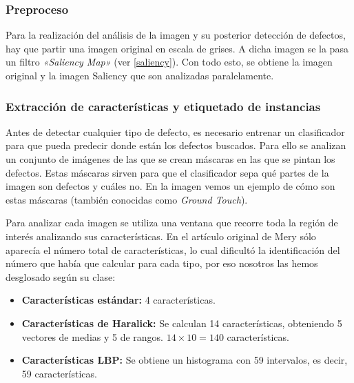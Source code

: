 \subsubsection{Preproceso}
Para la realización del análisis de la imagen y su posterior detección de defectos, hay que partir una imagen original en escala de grises. A dicha imagen se la pasa un filtro \textit{«Saliency Map»} (ver \ref{saliency}). Con todo esto, se obtiene la imagen original y la imagen Saliency que son analizadas paralelamente.


\subsubsection{Extracción de características y etiquetado de instancias}
Antes de detectar cualquier tipo de defecto, es necesario entrenar un clasificador para que pueda predecir donde están los defectos buscados. Para ello se analizan un conjunto de imágenes de las que se crean máscaras en las que se pintan los defectos. Estas máscaras sirven para que el clasificador sepa qué partes de la imagen son defectos y cuáles no. En la imagen  vemos un ejemplo de cómo son estas máscaras (también conocidas como \textit{Ground Touch}).


Para analizar cada imagen se utiliza una ventana que recorre toda la región de interés analizando sus características. En el artículo original de Mery \cite{DomingoMery} sólo aparecía el número total de características, lo cual dificultó la identificación del número que había que calcular para cada tipo, por eso nosotros las hemos desglosado según su clase:

\begin{itemize}
\item \textbf{Características estándar:} 4 características.
\item \textbf{Características de Haralick:} Se calculan 14 características, obteniendo 5 vectores de medias
y 5 de rangos. $14 \times 10 = 140$ características.
\item \textbf{Características LBP:} Se obtiene un histograma con 59 intervalos, es decir, 59 características.
\end{itemize}

